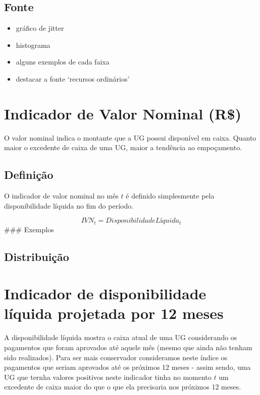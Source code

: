 \documentclass[
]{book}
\providecommand{\tightlist}{%
  \setlength{\itemsep}{0pt}\setlength{\parskip}{0pt}}
\begin{document}
\hypertarget{fonte}{%
\subsection{Fonte}\label{fonte}}

\begin{itemize}
\tightlist
\item
  gráfico de jitter
\item
  histograma
\item
  alguns exemplos de cada faixa
\item
  destacar a fonte `recursos ordinários'
\end{itemize}

\hypertarget{indicador-de-valor-nominal-r}{%
\section{Indicador de Valor Nominal (R\$)}\label{indicador-de-valor-nominal-r}}

O valor nominal indica o montante que a UG possui disponível em caixa. Quanto maior o excedente de caixa de uma UG, maior a tendência ao empoçamento.

\hypertarget{definiuxe7uxe3o-2}{%
\subsection{Definição}\label{definiuxe7uxe3o-2}}

O indicador de valor nominal no mês \(t\) é definido simplesmente pela disponibilidade líquida no fim do período.

\[IVN_t = DisponibilidadeLíquida_t\]
\#\#\# Exemplos

\hypertarget{distribuiuxe7uxe3o}{%
\subsection{Distribuição}\label{distribuiuxe7uxe3o}}

\hypertarget{indicador-de-disponibilidade-luxedquida-projetada-por-12-meses}{%
\section{Indicador de disponibilidade líquida projetada por 12 meses}\label{indicador-de-disponibilidade-luxedquida-projetada-por-12-meses}}

A disponibilidade líquida mostra o caixa atual de uma UG considerando os pagamentos que foram aprovados até aquele mês (mesmo que ainda não tenham sido realizados). Para ser mais conservador consideramos neste índice os pagamentos que seriam aprovados até os próximos 12 meses - assim sendo, uma UG que ternha valores positivos neste indicador tinha no momento \(t\) um excedente de caixa maior do que o que ela precisaria nos próximos 12 meses.
\end{document}
